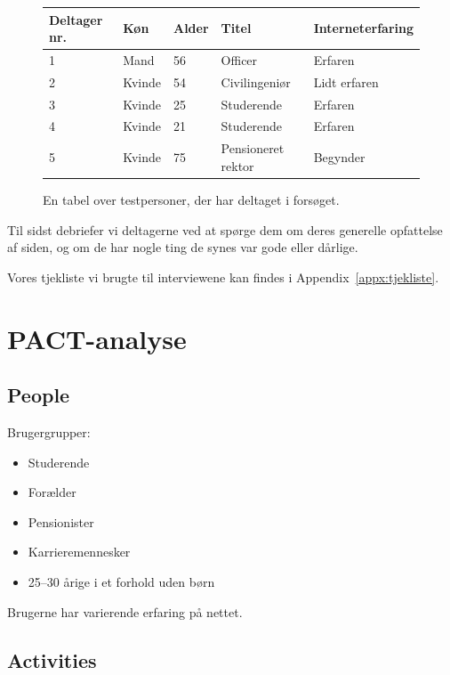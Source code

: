 \documentclass[a4paper, 12pt]{article}
\begin{document}
\begin{figure}[htbp]
  \centering
  \begin{tabular}{ l l l l l }
    \textbf{Deltager nr.} & \textbf{Køn}   & \textbf{Alder} & \textbf{Titel} &
    \textbf{Interneterfaring} \\
    \midrule
    1            & Mand   & 56    & Officer             & Erfaren         \\
    2            & Kvinde & 54    & Civilingeniør       & Lidt erfaren    \\
    3            & Kvinde & 25    & Studerende          & Erfaren         \\
    4            & Kvinde & 21    & Studerende          & Erfaren         \\
    5            & Kvinde & 75    & Pensioneret rektor  & Begynder        \\
  \end{tabular}
  \caption{En tabel over testpersoner, der har deltaget i forsøget.}
  \label{tab:testpersoner}
\end{figure}

Til sidst debriefer vi deltagerne ved at spørge dem om deres generelle
opfattelse af siden, og om de har nogle ting de synes var gode eller dårlige.

Vores tjekliste vi brugte til interviewene kan findes i Appendix~\ref{appx:tjekliste}.

\section{PACT-analyse}

\subsection{People}

Brugergrupper:
\begin{itemize}
\item Studerende
\item Forælder
\item Pensionister
\item Karrieremennesker
\item 25--30 årige i et forhold uden børn
\end{itemize}
Brugerne har varierende erfaring på nettet.

\subsection{Activities}
\end{document}
